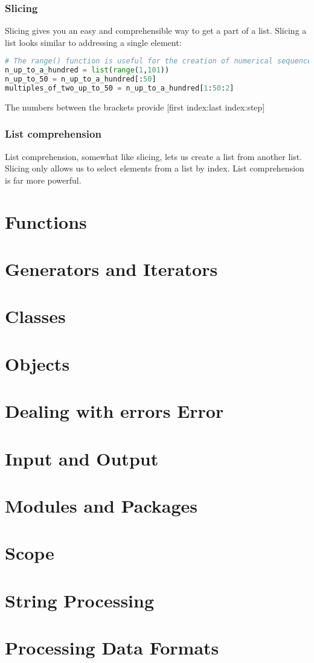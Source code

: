 \documentclass{article}
\begin{document}
\subsubsection{Slicing}

Slicing gives you an easy and comprehensible way to get a part of a list.
Slicing a list looks similar to addressing a single element:

\begin{lstlisting}[language=Python]
# The range() function is useful for the creation of numerical sequences.
n_up_to_a_hundred = list(range(1,101))
n_up_to_50 = n_up_to_a_hundred[:50]
multiples_of_two_up_to_50 = n_up_to_a_hundred[1:50:2]
\end{lstlisting}
The numbers between the brackets provide [first index:last index:step]


\subsubsection{List comprehension}

List comprehension, somewhat like slicing, lets us create a list from another list.
Slicing only allows us to select elements from a list by index.
List comprehension is far more powerful.



\section{Functions}
\section{Generators and Iterators}
\label{generators}
\section{Classes}
\section{Objects}
\section{Dealing with errors Error}
\section{Input and Output}
\section{Modules and Packages}
\section{Scope}
\section{String Processing}
\section{Processing Data Formats}
\end{document}
